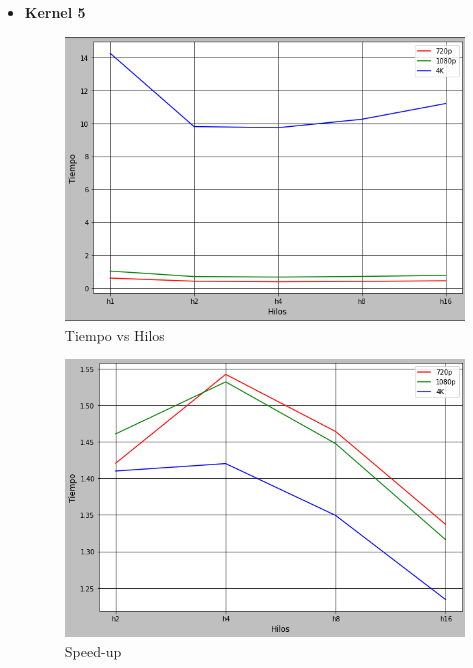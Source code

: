 \documentclass[a4paper,10pt]{IEEEtran}
\begin{document}
\begin{itemize}
    \item \textbf{Kernel 5} 
        \begin{figure}[H]
            \centering
            \includegraphics[scale = 0.3]{images/k5.png}
            \caption{Tiempo vs Hilos}
            \label{f01}
        \end{figure}{}
        
        \begin{figure}[H]
            \centering
            \includegraphics[scale = 0.3]{images/k5s.png}
            \caption{Speed-up}
            \label{f01a}
        \end{figure}{}
        

\end{itemize}
\end{document}
